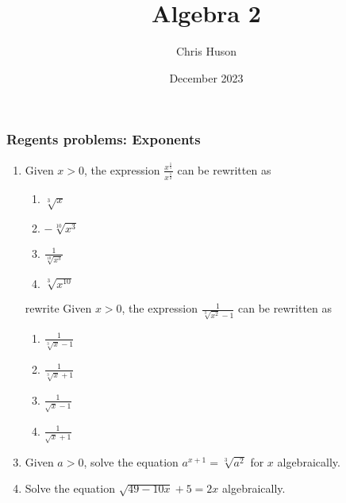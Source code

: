 \documentclass[12pt, twoside]{article}
\title{Algebra 2}
\author{Chris Huson}
\date{December 2023}
\begin{document}
\subsubsection*{Regents problems: Exponents}
\begin{enumerate}[itemsep=0.5cm]
\item Given $x > 0$, the expression $\displaystyle \frac{x^{\frac{1}{5}}}{x^{\frac{1}{2}}}$ can be rewritten as %
\begin{enumerate}
    \item $\sqrt[3]{x}$
    \item $-\sqrt[10]{x^3}$
    \item $\displaystyle \frac{1}{\sqrt[10]{x^3}}$
    \item $\sqrt[3]{x^{10}}$
\end{enumerate}

\item [rewrite] Given $x > 0$, the expression $\frac{1}{\sqrt[3]{x^2} - 1}$ can be rewritten as %
\begin{enumerate}
    \item $\frac{1}{\sqrt[3]{x} - 1}$
    \item $\frac{1}{\sqrt[3]{x} + 1}$
    \item $\frac{1}{\sqrt{x} - 1}$
    \item $\frac{1}{\sqrt{x} + 1}$
\end{enumerate}

\item Given $a > 0$, solve the equation $a^{x+1} = \sqrt[3]{a^2}$ for $x$ algebraically. %

\item Solve the equation $\sqrt{49-10x} +5 = 2x$ algebraically. %


\end{enumerate}
\end{document}

